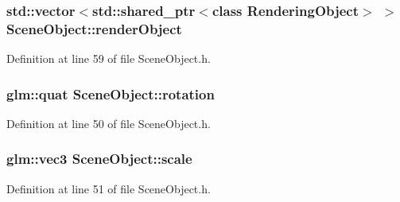 \hypertarget{class_scene_object_a4bbf98a19bd8e7ddd491fbb9a41b42cf}{}
\subsubsection[{render\+Object}]{\setlength{\rightskip}{0pt plus 5cm}std\+::vector$<$std\+::shared\+\_\+ptr$<$class {\bf Rendering\+Object}$>$ $>$ Scene\+Object\+::render\+Object\hspace{0.3cm}{\ttfamily [private]}}\label{class_scene_object_a4bbf98a19bd8e7ddd491fbb9a41b42cf}


Definition at line 59 of file Scene\+Object.\+h.

\hypertarget{class_scene_object_ae27376aaca87543a75b5a2cd0daf6e2f}{}
\subsubsection[{rotation}]{\setlength{\rightskip}{0pt plus 5cm}glm\+::quat Scene\+Object\+::rotation\hspace{0.3cm}{\ttfamily [protected]}}\label{class_scene_object_ae27376aaca87543a75b5a2cd0daf6e2f}


Definition at line 50 of file Scene\+Object.\+h.

\hypertarget{class_scene_object_a62c686b880fe4f58dec64a409e56de26}{}
\subsubsection[{scale}]{\setlength{\rightskip}{0pt plus 5cm}glm\+::vec3 Scene\+Object\+::scale\hspace{0.3cm}{\ttfamily [protected]}}\label{class_scene_object_a62c686b880fe4f58dec64a409e56de26}


Definition at line 51 of file Scene\+Object.\+h.

\hypertarget{class_scene_object_a1c129ecdd6bd8e2f34c713f5dd183361}{}

